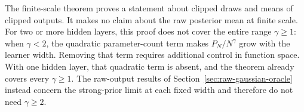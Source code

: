 The finite-scale theorem proves a statement about clipped draws and
means of clipped outputs.  It makes no claim about the raw posterior
mean at finite scale.  For two or more hidden layers, this proof does not cover the entire
range $\gamma\geq1$: when $\gamma<2$, the quadratic parameter-count
term makes $P_N/N^\gamma$ grow with the learner width.  Removing that
term requires additional control in function space.  With one hidden
layer, that quadratic term is absent, and the theorem already covers
every $\gamma\geq1$.  The raw-output results
of Section~\ref{sec:raw-gaussian-oracle} instead concern the
strong-prior limit at each fixed width and therefore do not need
$\gamma\geq2$.

